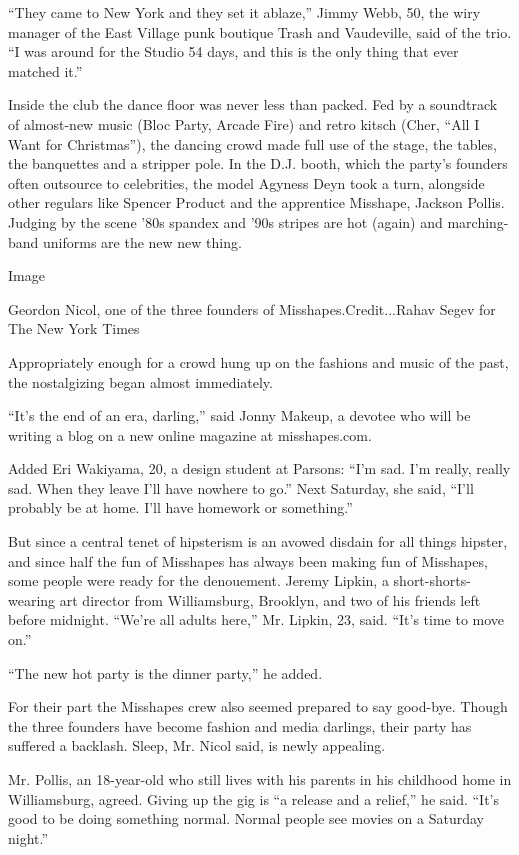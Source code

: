 ``They came to New York and they set it ablaze,'' Jimmy Webb, 50, the
wiry manager of the East Village punk boutique Trash and Vaudeville,
said of the trio. ``I was around for the Studio 54 days, and this is the
only thing that ever matched it.''

Inside the club the dance floor was never less than packed. Fed by a
soundtrack of almost-new music (Bloc Party, Arcade Fire) and retro
kitsch (Cher, ``All I Want for Christmas''), the dancing crowd made full
use of the stage, the tables, the banquettes and a stripper pole. In the
D.J. booth, which the party's founders often outsource to celebrities,
the model Agyness Deyn took a turn, alongside other regulars like
Spencer Product and the apprentice Misshape, Jackson Pollis. Judging by
the scene '80s spandex and '90s stripes are hot (again) and
marching-band uniforms are the new new thing.

Image

Geordon Nicol, one of the three founders of Misshapes.Credit...Rahav
Segev for The New York Times

Appropriately enough for a crowd hung up on the fashions and music of
the past, the nostalgizing began almost immediately.

``It's the end of an era, darling,'' said Jonny Makeup, a devotee who
will be writing a blog on a new online magazine at misshapes.com.

Added Eri Wakiyama, 20, a design student at Parsons: ``I'm sad. I'm
really, really sad. When they leave I'll have nowhere to go.'' Next
Saturday, she said, ``I'll probably be at home. I'll have homework or
something.''

But since a central tenet of hipsterism is an avowed disdain for all
things hipster, and since half the fun of Misshapes has always been
making fun of Misshapes, some people were ready for the denouement.
Jeremy Lipkin, a short-shorts-wearing art director from Williamsburg,
Brooklyn, and two of his friends left before midnight. ``We're all
adults here,'' Mr. Lipkin, 23, said. ``It's time to move on.''

``The new hot party is the dinner party,'' he added.

For their part the Misshapes crew also seemed prepared to say good-bye.
Though the three founders have become fashion and media darlings, their
party has suffered a backlash. Sleep, Mr. Nicol said, is newly
appealing.

Mr. Pollis, an 18-year-old who still lives with his parents in his
childhood home in Williamsburg, agreed. Giving up the gig is ``a release
and a relief,'' he said. ``It's good to be doing something normal.
Normal people see movies on a Saturday night.''

